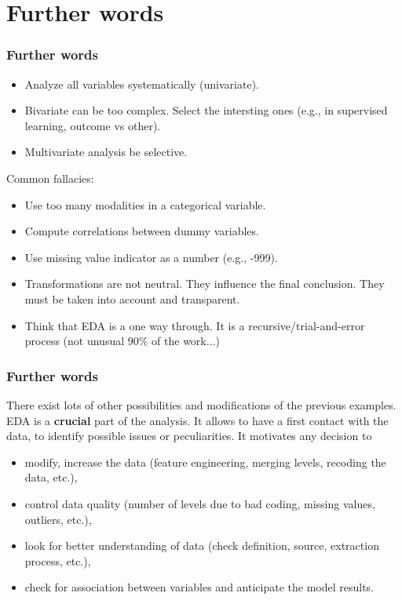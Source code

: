 \section{Further words}
\begin{frame}
\frametitle{Further words}
\begin{itemize}
\item Analyze all variables systematically (univariate).
\item Bivariate can be too complex. Select the intersting ones (e.g., in supervised learning, outcome vs other).
\item Multivariate analysis be selective.
\end{itemize}
Common fallacies:
\begin{itemize}
\item Use too many modalities in a categorical variable.
\item Compute correlations between dummy variables.
\item Use missing value indicator as a number (e.g., -999).
\item Transformations are not neutral. They influence the final conclusion. They must be taken into account and transparent.
\item Think that EDA is a one way through. It is a recursive/trial-and-error process (not unusual $90\%$ of the work...)
\end{itemize}
\end{frame}


\begin{frame}
\frametitle{Further words}
There exist lots of other possibilities and modifications of the previous examples. EDA is a {\bf crucial} part of the analysis. It allows to have a first contact with the data, to identify possible issues or peculiarities. It motivates any decision to
\begin{itemize}
\item modify, increase the data (feature engineering, merging levels, recoding the data, etc.),
\item control data quality (number of levels due to bad coding, missing values, outliers, etc.),
\item look for better understanding of data (check definition, source, extraction process, etc.),
\item check for association between variables and anticipate the model results.
\end{itemize}
\end{frame}

